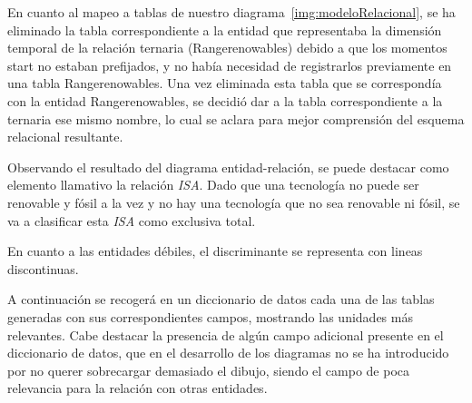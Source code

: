 En cuanto al mapeo a tablas de nuestro diagrama~\ref{img:modeloRelacional}, se ha eliminado la tabla correspondiente a la entidad que representaba la dimensión temporal de la relación ternaria (Rangerenowables) debido a que los momentos start no estaban prefijados, y no había necesidad de registrarlos previamente en una tabla Rangerenowables. Una vez eliminada esta tabla que se correspondía con la entidad Rangerenowables, se decidió dar a la tabla correspondiente a la ternaria ese mismo nombre, lo cual se aclara para mejor comprensión del esquema relacional resultante.

Observando el resultado del diagrama entidad-relación, se puede destacar como elemento llamativo la relación \textit{ISA}. Dado que una tecnología no puede ser renovable y fósil a la vez y no hay una tecnología que no sea renovable ni fósil, se va a clasificar esta \textit{ISA} como exclusiva total. 

En cuanto a las entidades débiles, el discriminante se representa con lineas discontinuas. 

A continuación se recogerá en un diccionario de datos cada una de las tablas generadas con sus correspondientes campos, mostrando las unidades más relevantes. Cabe destacar la presencia de algún campo adicional presente en el diccionario de datos, que en el desarrollo de los diagramas no se ha introducido por no querer sobrecargar demasiado el dibujo, siendo el campo de poca relevancia para la relación con otras entidades. 

